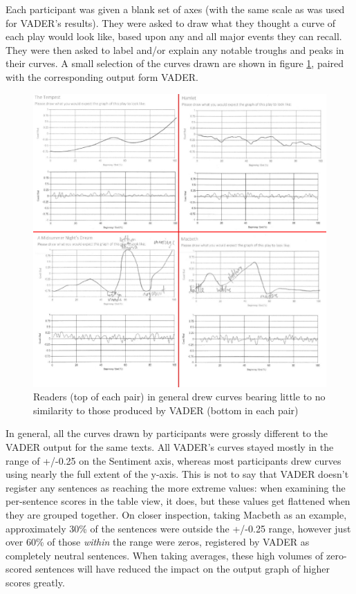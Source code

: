 \documentclass[a4paper]{article}
\begin{document}
            Each participant was given a blank set of axes (with the same scale as was used for VADER's results). They were asked to draw what they thought a curve of each play would look like, based upon any and all major events they can recall. They were then asked to label and/or explain any notable troughs and peaks in their curves. A small selection of the curves drawn are shown in figure \ref{fig:readerVsVader}, paired with the corresponding output form VADER.
            \begin{figure}
                \includegraphics[width=1\textwidth]{Figures/Survey/readerVsVader}
                \centering
                \caption{Readers (top of each pair) in general drew curves bearing little to no similarity to those produced by VADER (bottom in each pair)}
                \label{fig:readerVsVader}
            \end{figure}
            In general, all the curves drawn by participants were grossly different to the VADER output for the same texts. All VADER's curves stayed mostly in the range of +/-0.25 on the Sentiment axis, whereas most participants drew curves using nearly the full extent of the y-axis. This is not to say that VADER doesn't register any sentences as reaching the more extreme values: when examining the per-sentence scores in the table view, it does, but these values get flattened when they are grouped together. On closer inspection, taking Macbeth as an example, approximately 30\% of the sentences were outside the +/-0.25 range, however  just over 60\% of those \textit{within} the range were zeros, registered by VADER as completely neutral sentences. When taking averages, these high volumes of zero-scored sentences will have reduced the impact on the output graph of higher scores greatly.
\end{document}

